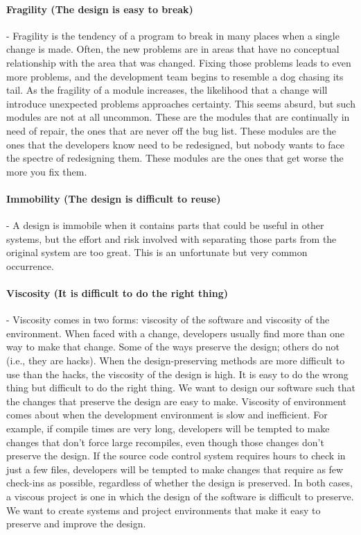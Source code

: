 \documentclass{llncs}
\begin{document}
\paragraph{Fragility (The design is easy to break)} - Fragility is the tendency of a program to break in many places when a single change is made.
Often, the new problems are in areas that have no conceptual relationship with the area that was changed.
Fixing those problems leads to even more problems, and the development team begins to resemble a dog chasing its tail.
As the fragility of a module increases, the likelihood that a change will introduce unexpected problems approaches certainty.
This seems absurd, but such modules are not at all uncommon.
These are the modules that are continually in need of repair, the ones that are never off the bug list.
These modules are the ones that the developers know need to be redesigned, but nobody wants to face the spectre of redesigning them.
These modules are the ones that get worse the more you fix them.

\paragraph{Immobility (The design is difficult to reuse)} - A design is immobile when it contains parts that could be useful in other systems, but the effort and risk involved with separating those parts from the original system are too great.
This is an unfortunate but very common occurrence.

\paragraph{Viscosity (It is difficult to do the right thing)} - Viscosity comes in two forms: viscosity of the software and viscosity of the environment. 
When faced with a change, developers usually find more than one way to make that change.
Some of the ways preserve the design; others do not (i.e., they are hacks).
When the design-preserving methods are more difficult to use than the hacks, the viscosity of the design is high.
It is easy to do the wrong thing but difficult to do the right thing.
We want to design our software such that the changes that preserve the design are easy to make.
Viscosity of environment comes about when the development environment is slow and inefficient.
For example, if compile times are very long, developers will be tempted to make changes that don't force large recompiles, even though those changes don't preserve the design. 
If the source code control system requires hours to check in just a few files, developers will be tempted to make changes that require as few check-ins as possible, regardless of whether the design is preserved.
In both cases, a viscous project is one in which the design of the software is difficult to preserve. 
We want to create systems and project environments that make it easy to preserve and improve the
design.
\end{document}
